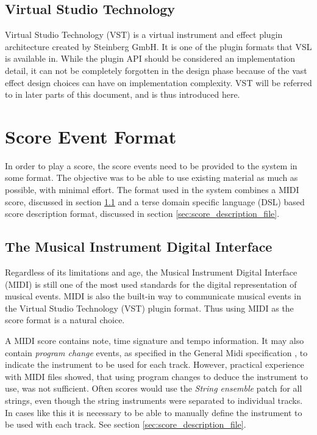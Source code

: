 \subsection{Virtual Studio Technology}

Virtual Studio Technology (VST) \cite{vst} is
a virtual instrument and effect plugin architecture created by Steinberg GmbH.
It is one of the plugin formats that VSL is available in.
While the plugin API should be considered an implementation detail,
it can not be completely forgotten in the design phase
because of the vast effect design choices can have on implementation complexity.
VST will be referred to in later parts of this document,
and is thus introduced here.

\section{Score Event Format}

In order to play a score,
the score events need to be provided to the system in some format.
The objective was to be able to use existing material as much as possible,
with minimal effort.
The format used in the system combines
a MIDI score, discussed in section \ref{sec:midi} and
a terse domain specific language (DSL) based score description format,
discussed in section \ref{sec:score_description_file}.

\subsection{The Musical Instrument Digital Interface}
\label{sec:midi}

Regardless of its limitations and age,
the Musical Instrument Digital Interface (MIDI)
is still one of the most used standards
for the digital representation of musical events.
MIDI is also the built-in way to communicate musical events
in the Virtual Studio Technology (VST) plugin format.
Thus using MIDI as the score format is a natural choice.

A MIDI score contains note, time signature and tempo information.
It may also contain \textit{program change} events,
as specified in the General Midi specification \cite{GeneralMidi},
to indicate the instrument to be used for each track.
However, practical experience with MIDI files showed,
that using program changes to deduce the instrument to use,
was not sufficient.
Often scores would use the
\textit{String ensemble} patch for all strings,
even though the string instruments were separated to individual tracks.
In cases like this it is necessary to be able to manually
define the instrument to be used with each track.
See section \ref{sec:score_description_file}.

